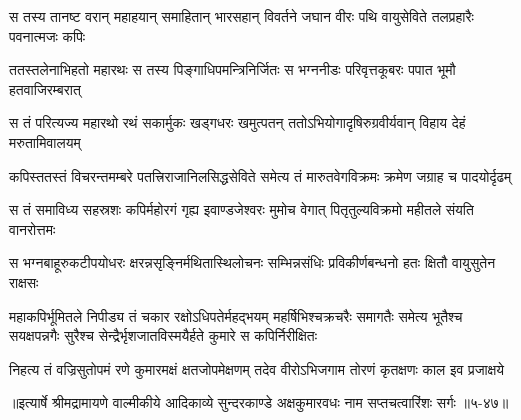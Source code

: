 \twolineshloka
{स तस्य तानष्ट वरान् महाहयान् समाहितान् भारसहान् विवर्तने}
{जघान वीरः पथि वायुसेविते तलप्रहारैः पवनात्मजः कपिः} %

\twolineshloka
{ततस्तलेनाभिहतो महारथः स तस्य पिङ्गाधिपमन्त्रिनिर्जितः}
{स भग्ननीडः परिवृत्तकूबरः पपात भूमौ हतवाजिरम्बरात्} %

\twolineshloka
{स तं परित्यज्य महारथो रथं सकार्मुकः खड्गधरः खमुत्पतन्}
{ततोऽभियोगादृषिरुग्रवीर्यवान् विहाय देहं मरुतामिवालयम्} %

\twolineshloka
{कपिस्ततस्तं विचरन्तमम्बरे पतत्त्रिराजानिलसिद्धसेविते}
{समेत्य तं मारुतवेगविक्रमः क्रमेण जग्राह च पादयोर्दृढम्} %

\twolineshloka
{स तं समाविध्य सहस्रशः कपिर्महोरगं गृह्य इवाण्डजेश्वरः}
{मुमोच वेगात् पितृतुल्यविक्रमो महीतले संयति वानरोत्तमः} %

\twolineshloka
{स भग्नबाहूरुकटीपयोधरः क्षरन्नसृङ्निर्मथितास्थिलोचनः}
{सम्भिन्नसंधिः प्रविकीर्णबन्धनो हतः क्षितौ वायुसुतेन राक्षसः} %

\threelineshloka
{महाकपिर्भूमितले निपीड्य तं चकार रक्षोऽधिपतेर्महद्भयम्}
{महर्षिभिश्चक्रचरैः समागतैः समेत्य भूतैश्च सयक्षपन्नगैः}
{सुरैश्च सेन्द्रैर्भृशजातविस्मयैर्हते कुमारे स कपिर्निरीक्षितः} %

\twolineshloka
{निहत्य तं वज्रिसुतोपमं रणे कुमारमक्षं क्षतजोपमेक्षणम्}
{तदेव वीरोऽभिजगाम तोरणं कृतक्षणः काल इव प्रजाक्षये} %


॥इत्यार्षे श्रीमद्रामायणे वाल्मीकीये आदिकाव्ये सुन्दरकाण्डे अक्षकुमारवधः नाम सप्तचत्वारिंशः सर्गः ॥५-४७॥
